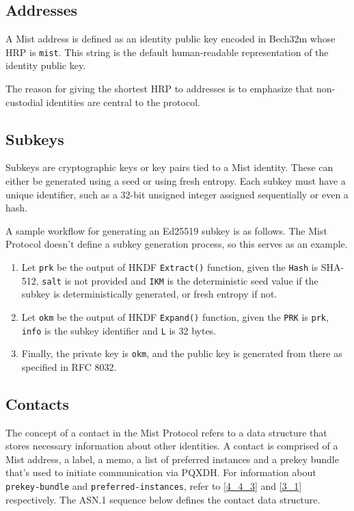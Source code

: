 \documentclass{article}
\begin{document}
\subsection{Addresses}
A Mist address is defined as an identity public key encoded in Bech32m whose HRP is \verb|mist|. This string is the default human-readable representation of the identity public key.

The reason for giving the shortest HRP to addresses is to emphasize that non-custodial identities are central to the protocol.

\subsection{Subkeys}
Subkeys are cryptographic keys or key pairs tied to a Mist identity. These can either be generated using a seed or using fresh entropy. Each subkey must have a unique identifier, such as a 32-bit unsigned integer assigned sequentially or even a hash.

A sample workflow for generating an Ed25519 subkey is as follows. The Mist Protocol doesn't define a subkey generation process, so this serves as an example.

\begin{enumerate}
	\item Let \verb|prk| be the output of HKDF \verb|Extract()| function, given the \verb|Hash| is SHA-512, \verb|salt| is not provided and \verb|IKM| is the deterministic seed value if the subkey is deterministically generated, or fresh entropy if not.
	\item Let \verb|okm| be the output of HKDF \verb|Expand()| function, given the \verb|PRK| is \verb|prk|, \verb|info| is the subkey identifier and \verb|L| is 32 bytes.
	\item Finally, the private key is \verb|okm|, and the public key is generated from there as specified in RFC 8032.
\end{enumerate}

\subsection{Contacts}
The concept of a contact in the Mist Protocol refers to a data structure that stores necessary information about other identities. A contact is comprised of a Mist address, a label, a memo, a list of preferred instances and a prekey bundle that's used to initiate communication via PQXDH. For information about \verb|prekey-bundle| and \verb|preferred-instances|, refer to \ref{4_4_3} and \ref{3_1} respectively. The ASN.1 sequence below defines the contact data structure.
\end{document}
